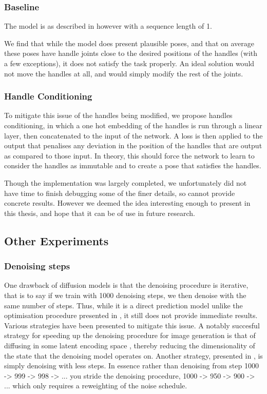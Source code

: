 \subsubsection{Baseline}
The model is as described in  however with a sequence length of 1.

We find that while the model does present plausible poses, and that on average these poses have handle joints close to the desired positions of the handles (with a few exceptions), it does not satisfy the task properly.  An ideal solution would not move the handles at all, and would simply modify the rest of the joints.



\subsubsection{Handle Conditioning}
To mitigate this issue of the handles being modified, we propose handles conditioning, in which a one hot embedding of the handles is run through a linear layer, then concatenated to the input of the network. A loss is then applied to the output that penalises any deviation in the position of the handles that are output as compared to those input. In theory, this should force the network to learn to consider the handles as immutable and to create a pose that satisfies the handles.

Though the implementation was largely completed, we unfortunately did not have time to finish debugging some of the finer details, so cannot provide concrete results. However we deemed the idea interesting enough to present in this thesis, and hope that it can be of use in future research.


\subsection{Other Experiments}
\subsubsection{Denoising steps}
One drawback of diffusion models is that the denoising procedure is iterative, that is to say if we train with 1000 denoising steps, we then denoise with the same number of steps. Thus, while it is a direct prediction model unlike the optimisation procedure presented in , it still does not provide immediate results. Various strategies have been presented to mitigate this issue. A notably succesful strategy for speeding up the denoising procedure for image generation is that of diffusing in some latent encoding space \cite{stable_diffusion}, thereby reducing the dimensionality of the state that the denoising model operates on. Another strategy, presented in \cite{improved_diffusion}, is simply denoising with less steps. In essence rather than denoising from step 1000 -> 999 -> 998 -> ... you stride the denoising procedure, 1000 -> 950 -> 900 -> ... which only requires a reweighting of the noise schedule. 

